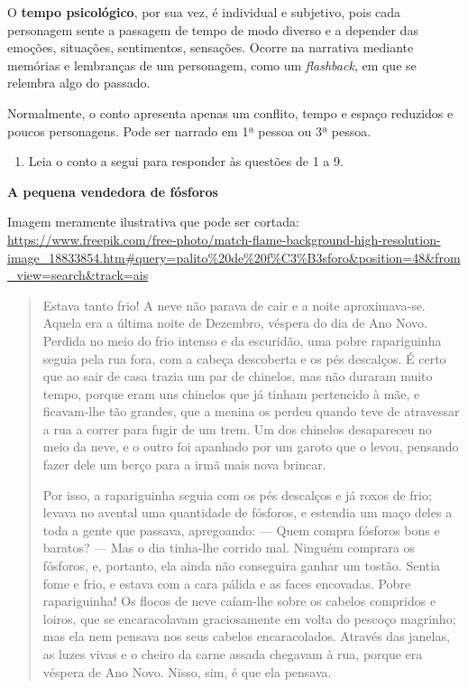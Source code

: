 \begin{itemize}
\begin{itemize}
{O \textbf{tempo psicológico}, por sua vez, é individual e subjetivo,
pois cada personagem sente a passagem de tempo de modo diverso e a
depender das emoções, situações, sentimentos, sensações. Ocorre na
narrativa mediante memórias e lembranças de um personagem, como um
\emph{flashback}, em que se relembra algo do passado.

Normalmente, o conto apresenta apenas um conflito, tempo e espaço
reduzidos e poucos personagens. Pode ser narrado em 1ª pessoa ou 3ª
pessoa.
}


\begin{enumerate}
\def\labelenumi{\arabic{enumi}.}
\tightlist
\item
  Leia o conto a segui para responder às questões de 1 a 9.
\end{enumerate}


\textbf{A pequena vendedora de fósforos}

Imagem meramente ilustrativa que pode ser cortada:
\url{https://www.freepik.com/free-photo/match-flame-background-high-resolution-image_18833854.htm\#query=palito\%20de\%20f\%C3\%B3sforo\&position=48\&from_view=search\&track=ais}

\begin{quote}
Estava tanto frio! A neve não parava de cair e a noite aproximava-se.
Aquela era a última noite de Dezembro, véspera do dia de Ano Novo.
Perdida no meio do frio intenso e da escuridão, uma pobre rapariguinha
seguia pela rua fora, com a cabeça descoberta e os pés descalços. É
certo que ao sair de casa trazia um par de chinelos, mas não duraram
muito tempo, porque eram uns chinelos que já tinham pertencido à mãe, e
ficavam-lhe tão grandes, que a menina os perdeu quando teve de
atravessar a rua a correr para fugir de um trem. Um dos chinelos
desapareceu no meio da neve, e o outro foi apanhado por um garoto que o
levou, pensando fazer dele um berço para a irmã mais nova brincar.

Por isso, a rapariguinha seguia com os pés descalços e já roxos de frio;
levava no avental uma quantidade de fósforos, e estendia um maço deles a
toda a gente que passava, apregoando: --- Quem compra fósforos bons e
baratos? --- Mas o dia tinha-lhe corrido mal. Ninguém comprara os
fósforos, e, portanto, ela ainda não conseguira ganhar um tostão. Sentia
fome e frio, e estava com a cara pálida e as faces encovadas. Pobre
rapariguinha! Os flocos de neve caíam-lhe sobre os cabelos compridos e
loiros, que se encaracolavam graciosamente em volta do pescoço magrinho;
mas ela nem pensava nos seus cabelos encaracolados. Através das janelas,
as luzes vivas e o cheiro da carne assada chegavam à rua, porque era
véspera de Ano Novo. Nisso, sim, é que ela pensava.


\end{quote}
\end{itemize}
\end{itemize}
